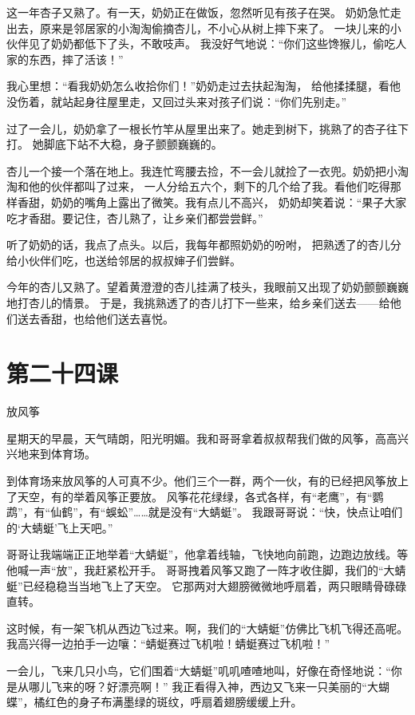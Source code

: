 \documentclass[12pt,UTF8]{ctexbook}
\begin{document}
这一年杏子又熟了。有一天，奶奶正在做饭，忽然听见有孩子在哭。
奶奶急忙走出去，原来是邻居家的小淘淘偷摘杏儿，不小心从树上摔下来了。
一块儿来的小伙伴见了奶奶都低下了头，不敢吱声。
我没好气地说：“你们这些馋猴儿，偷吃人家的东西，摔了活该！”

我心里想：“看我奶奶怎么收拾你们！”奶奶走过去扶起淘淘，
给他揉揉腿，看他没伤着，就站起身往屋里走，又回过头来对孩子们说：“你们先别走。”

过了一会儿，奶奶拿了一根长竹竿从屋里出来了。她走到树下，挑熟了的杏子往下打。
她脚底下站不大稳，身子颤颤巍巍的。

杏儿一个接一个落在地上。我连忙弯腰去捡，不一会儿就捡了一衣兜。奶奶把小淘淘和他的伙伴都叫了过来，
一人分给五六个，剩下的几个给了我。看他们吃得那样香甜，奶奶的嘴角上露出了微笑。我有点儿不高兴，
奶奶却笑着说：“果子大家吃才香甜。要记住，杏儿熟了，让乡亲们都尝尝鲜。''

听了奶奶的话，我点了点头。以后，我每年都照奶奶的吩咐，
把熟透了的杏儿分给小伙伴们吃，也送给邻居的叔叔婶子们尝鲜。

今年的杏儿又熟了。望着黄澄澄的杏儿挂满了枝头，我眼前又出现了奶奶颤颤巍巍地打杏儿的情景。
于是，我挑熟透了的杏儿打下一些来，给乡亲们送去——给他们送去香甜，也给他们送去喜悦。

\section{第二十四课}

放风筝

星期天的早晨，天气晴朗，阳光明媚。我和哥哥拿着叔叔帮我们做的风筝，高高兴兴地来到体育场。

到体育场来放风筝的人可真不少。他们三个一群，两个一伙，有的已经把风筝放上了天空，有的举着风筝正要放。
风筝花花绿绿，各式各样，有“老鹰”，有“鹦鹉”，有“仙鹤”，有“蜈蚣”……就是没有“大蜻蜓”。
我跟哥哥说：“快，快点让咱们的‘大蜻蜓’飞上天吧。”

哥哥让我端端正正地举着“大蜻蜓”，他拿着线轴，飞快地向前跑，边跑边放线。等他喊一声“放”，我赶紧松开手。
哥哥拽着风筝又跑了一阵才收住脚，我们的“大蜻蜓”已经稳稳当当地飞上了天空。
它那两对大翅膀微微地呼扇着，两只眼睛骨碌碌直转。

这时候，有一架飞机从西边飞过来。啊，我们的“大蜻蜓”仿佛比飞机飞得还高呢。
我高兴得一边拍手一边嚷：“蜻蜓赛过飞机啦！蜻蜓赛过飞机啦！”

一会儿，飞来几只小鸟，它们围着“大蜻蜓”叽叽喳喳地叫，好像在奇怪地说：“你是从哪儿飞来的呀？好漂亮啊！”
我正看得入神，西边又飞来一只美丽的“大蝴蝶”，橘红色的身子布满墨绿的斑纹，呼扇着翅膀缓缓上升。
\end{document}
